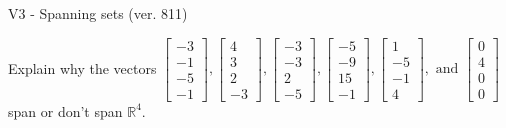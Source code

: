 \begin{exercise}
  \begin{exerciseTitle}V3 - Spanning sets (ver. 811)\end{exerciseTitle}
  \begin{exerciseStatement}
    Explain why the vectors \(\left[\begin{array}{r}
-3 \\
-1 \\
-5 \\
-1
\end{array}\right] , \left[\begin{array}{r}
4 \\
3 \\
2 \\
-3
\end{array}\right] , \left[\begin{array}{r}
-3 \\
-3 \\
2 \\
-5
\end{array}\right] , \left[\begin{array}{r}
-5 \\
-9 \\
15 \\
-1
\end{array}\right] , \left[\begin{array}{r}
1 \\
-5 \\
-1 \\
4
\end{array}\right] , \text{ and } \left[\begin{array}{r}
0 \\
4 \\
0 \\
0
\end{array}\right]\) span or don't span \(\mathbb{R}^4\). 
	



\end{exerciseStatement}
\end{exercise}
